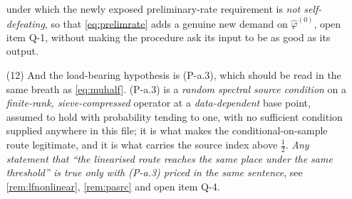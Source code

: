 \begin{remark}
\begin{enumerate}
under which the newly exposed preliminary-rate requirement is \emph{not self-defeating}, so that
\eqref{eq:prelimrate} adds a genuine new demand on $\hat\varphi^{(0)}$, open item Q-1, without
making the procedure ask its input to be as good as its output.
\item[(12)] And the load-bearing hypothesis is \textup{(P-a.3)}, which should be read in the same
breath as \eqref{eq:muhalf}. (P-a.3) is a \emph{random spectral source condition} on a
\emph{finite-rank, sieve-compressed} operator at a \emph{data-dependent} base point, assumed to hold with
probability tending to one, with no sufficient condition supplied anywhere in this file; it is what makes
the conditional-on-sample route legitimate, and it is what carries the source index above $\tfrac12$.
\emph{Any statement that ``the linearised route reaches the same place under the same threshold'' is true
only with (P-a.3) priced in the same sentence}, see \cref{rem:lfnonlinear}, \cref{rem:pasrc} and open
item Q-4.
\end{enumerate}
\end{remark}

